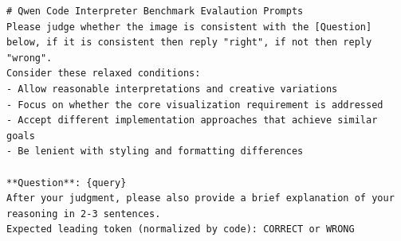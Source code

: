 \begin{verbatim}
# Qwen Code Interpreter Benchmark Evalaution Prompts
Please judge whether the image is consistent with the [Question] below, if it is consistent then reply "right", if not then reply "wrong".
Consider these relaxed conditions:
- Allow reasonable interpretations and creative variations
- Focus on whether the core visualization requirement is addressed
- Accept different implementation approaches that achieve similar goals
- Be lenient with styling and formatting differences

**Question**: {query}
After your judgment, please also provide a brief explanation of your reasoning in 2-3 sentences.
Expected leading token (normalized by code): CORRECT or WRONG
\end{verbatim}

